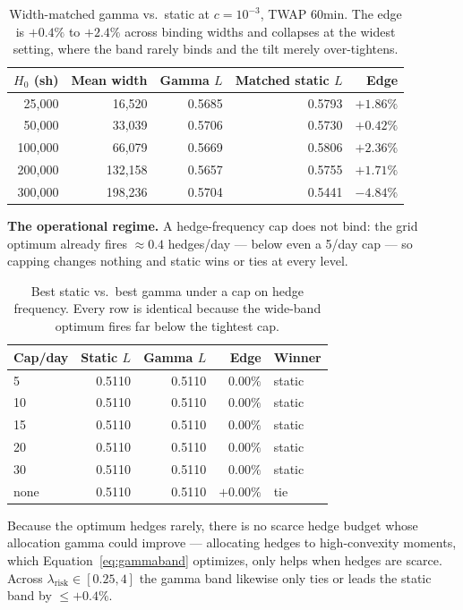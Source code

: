 \documentclass{article}
\begin{document}
\begin{table}[htbp]
\centering
\small
\begin{tabular}{rrrrr}
\toprule
$H_0$ (sh) & \textbf{Mean width} & \textbf{Gamma} $L$ & \textbf{Matched static} $L$ & \textbf{Edge} \\
\midrule
25{,}000  & 16{,}520  & 0.5685 & 0.5793 & $+1.86\%$ \\
50{,}000  & 33{,}039  & 0.5706 & 0.5730 & $+0.42\%$ \\
100{,}000 & 66{,}079  & 0.5669 & 0.5806 & $+2.36\%$ \\
200{,}000 & 132{,}158 & 0.5657 & 0.5755 & $+1.71\%$ \\
300{,}000 & 198{,}236 & 0.5704 & 0.5441 & $-4.84\%$ \\
\bottomrule
\end{tabular}
\caption{Width-matched gamma vs.\ static at $c = 10^{-3}$, TWAP 60min. The edge is $+0.4\%$
to $+2.4\%$ across binding widths and collapses at the widest setting, where the band rarely
binds and the tilt merely over-tightens.}
\end{table}

\textbf{The operational regime.} A hedge-frequency cap does not bind: the grid optimum
already fires $\approx0.4$ hedges/day --- below even a 5/day cap --- so capping changes
nothing and static wins or ties at every level.

\begin{table}[htbp]
\centering
\small
\begin{tabular}{lrrrl}
\toprule
\textbf{Cap/day} & \textbf{Static} $L$ & \textbf{Gamma} $L$ & \textbf{Edge} & \textbf{Winner} \\
\midrule
5    & 0.5110 & 0.5110 & $0.00\%$  & static \\
10   & 0.5110 & 0.5110 & $0.00\%$  & static \\
15   & 0.5110 & 0.5110 & $0.00\%$  & static \\
20   & 0.5110 & 0.5110 & $0.00\%$  & static \\
30   & 0.5110 & 0.5110 & $0.00\%$  & static \\
\midrule
none & 0.5110 & 0.5110 & $+0.00\%$ & tie \\
\bottomrule
\end{tabular}
\caption{Best static vs.\ best gamma under a cap on hedge frequency. Every row is identical
because the wide-band optimum fires far below the tightest cap.}
\end{table}

Because the optimum hedges rarely, there is no scarce hedge budget whose allocation gamma
could improve --- allocating hedges to high-convexity moments, which
Equation~\eqref{eq:gammaband} optimizes, only helps when hedges are scarce. Across
$\lambda_{\text{risk}} \in [0.25, 4]$ the gamma band likewise only ties or leads the static
band by $\le +0.4\%$.
\end{document}
